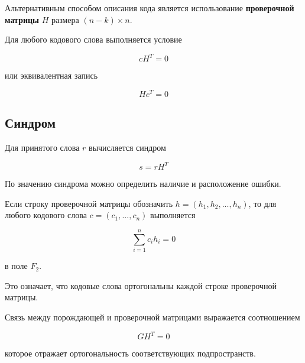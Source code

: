 \documentclass[a4paper,12pt]{article}
\begin{document}
Альтернативным способом описания кода является
использование \textbf{проверочной матрицы} $H$
размера $(n-k) \times n$.

Для любого кодового слова выполняется условие

\[
cH^T = 0
\]

или эквивалентная запись

\[
Hc^T = 0
\]

\subsection{Синдром}

Для принятого слова $r$ вычисляется синдром

\[
s = rH^T
\]

По значению синдрома можно определить наличие
и расположение ошибки.

Если строку проверочной матрицы обозначить
$h = (h_1, h_2, ..., h_n)$, то для любого
кодового слова $c = (c_1,...,c_n)$ выполняется

\[
\sum_{i=1}^{n} c_i h_i = 0
\]

в поле $F_2$.

Это означает, что кодовые слова ортогональны
каждой строке проверочной матрицы.

Связь между порождающей и проверочной матрицами
выражается соотношением

\[
GH^T = 0
\]

которое отражает ортогональность соответствующих
подпространств.
\end{document}
